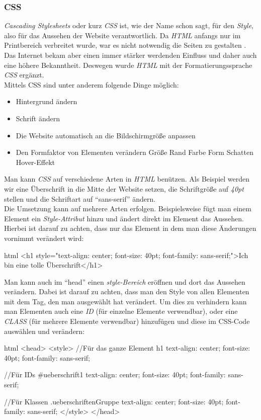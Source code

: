 		\subsubsection{CSS}
		\textit{Cascading Stylesheets} oder kurz \textit{CSS} ist, wie der Name schon sagt, für den \textit{Style}, also für das Aussehen der Website verantwortlich. Da \textit{HTML} anfangs nur im Printbereich verbreitet wurde, war es nicht notwendig die Seiten zu gestalten \cite{html5-css3-def, html5-css3-handbuch}. Das Internet bekam aber einen immer stärker werdenden Einfluss und daher auch eine höhere Bekanntheit. Deswegen wurde \textit{HTML} mit der Formatierungssprache \textit{CSS} ergänzt.\\
		Mittels CSS sind unter anderem folgende Dinge möglich:
		\begin{itemize}
			\item Hintergrund ändern
			\item Schrift ändern
			\item Die Website automatisch an die Bildschirmgröße anpassen
			\item Den Formfaktor von Elementen verändern
			\subitem Größe
			\subitem Rand
			\subitem Farbe
			\subitem Form
			\subitem Schatten
			\subitem Hover-Effekt
		\end{itemize}
		Man kann \textit{CSS} auf verschiedene Arten in \textit{HTML} benützen. Als Beispiel werden wir eine Überschrift in die Mitte der Website setzen, die Schriftgröße auf \textit{40pt} stellen und die Schriftart auf \enquote{sans-serif} ändern.\\
		Die Umsetzung kann auf mehrere Arten erfolgen. Beispielsweise fügt man einem Element ein \textit{Style-Attribut} hinzu und ändert direkt im Element das Aussehen. Hierbei ist darauf zu achten, dass nur das Element in dem man diese Änderungen vornimmt verändert wird:
		\begin{code}{html}
			<h1 style="text-align: center; font-size: 40pt; font-family: sans-serif;">Ich bin eine tolle Überschrift</h1>
		\end{code}
		Man kann auch im \enquote{head} einen \textit{style-Bereich} eröffnen und dort das Aussehen verändern. Dabei ist darauf zu achten, dass man den Style von allen Elementen mit dem Tag, den man ausgewählt hat verändert. Um dies zu verhindern kann man Elementen auch eine \textit{ID} (für einzelne Elemente verwendbar), oder eine \textit{CLASS} (für mehrere Elemente verwendbar) hinzufügen und diese im CSS-Code auswählen und verändern:
		\begin{code}{html}
				<head>
					<style>
					//Für das ganze Element
					h1 {
						text-align: center; 
						font-size: 40pt; 
						font-family: sans-serif;
					}
				
					//Für IDs
					#ueberschrift1 {
						text-align: center; 
						font-size: 40pt; 
						font-family: sans-serif;
					}
					
					//Für Klassen
					.ueberschriftenGruppe {
						text-align: center; 
						font-size: 40pt; 
						font-family: sans-serif;
					}
					</style>
				</head>
		\end{code}
